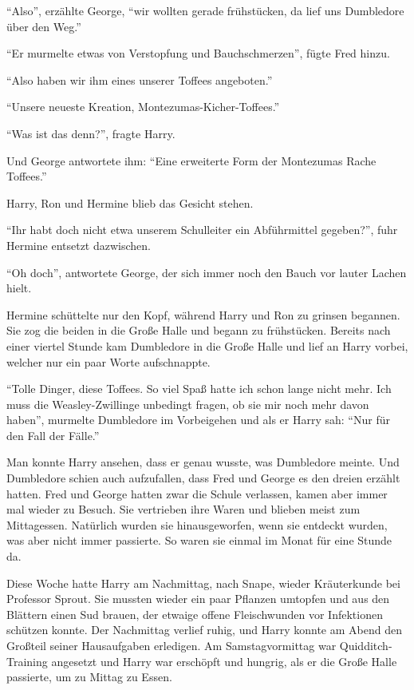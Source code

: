 \enquote{Also}, erzählte George, \enquote{wir wollten gerade frühstücken, da lief uns Dumbledore über den Weg.}

\enquote{Er murmelte etwas von Verstopfung und Bauchschmerzen}, fügte Fred hinzu.

\enquote{Also haben wir ihm eines unserer Toffees angeboten.}

\enquote{Unsere neueste Kreation, Montezumas-Kicher-Toffees.}

\enquote{Was ist das denn?}, fragte Harry.

Und George antwortete ihm: \enquote{Eine erweiterte Form der Montezumas Rache Toffees.}

Harry, Ron und Hermine blieb das Gesicht stehen.

\enquote{Ihr habt doch nicht etwa unserem Schulleiter ein Abführmittel gegeben?}, fuhr Hermine entsetzt dazwischen.

\enquote{Oh doch}, antwortete George, der sich immer noch den Bauch vor lauter Lachen hielt.

Hermine schüttelte nur den Kopf, während Harry und Ron zu grinsen begannen. Sie zog die beiden in die Große Halle und begann zu frühstücken. Bereits nach einer viertel Stunde kam Dumbledore in die Große Halle und lief an Harry vorbei, welcher nur ein paar Worte aufschnappte.

\enquote{Tolle Dinger, diese Toffees. So viel Spaß hatte ich schon lange nicht mehr. Ich muss die Weasley-Zwillinge unbedingt fragen, ob sie mir noch mehr davon haben}, murmelte Dumbledore im Vorbeigehen und als er Harry sah: \enquote{Nur für den Fall der Fälle.}

Man konnte Harry ansehen, dass er genau wusste, was Dumbledore meinte. Und Dumbledore schien auch aufzufallen, dass Fred und George es den dreien erzählt hatten. Fred und George hatten zwar die Schule verlassen, kamen aber immer mal wieder zu Besuch. Sie vertrieben ihre Waren und blieben meist zum Mittagessen. Natürlich wurden sie hinausgeworfen, wenn sie entdeckt wurden, was aber nicht immer passierte. So waren sie einmal im Monat für eine Stunde da.

Diese Woche hatte Harry am Nachmittag, nach Snape, wieder Kräuterkunde bei Professor Sprout. Sie mussten wieder ein paar Pflanzen umtopfen und aus den Blättern einen Sud brauen, der etwaige offene Fleischwunden vor Infektionen schützen konnte. Der Nachmittag verlief ruhig, und Harry konnte am Abend den Großteil seiner Hausaufgaben erledigen. Am Samstagvormittag war Quidditch-Training angesetzt und Harry war erschöpft und hungrig, als er die Große Halle passierte, um zu Mittag zu Essen.

